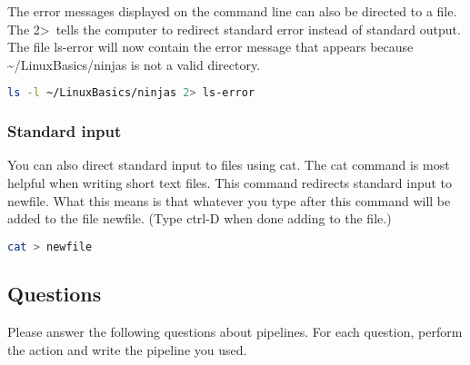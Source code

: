 \documentclass[11pt,a4paper]{article}
\begin{document}
\indent The error messages displayed on the command line can also be directed to a file. The 2\textgreater\ tells the computer to redirect standard error instead of standard output. The file ls-error will now contain the error message that appears because \textasciitilde /LinuxBasics/ninjas is not a valid directory.

\begin{lstlisting}[basicstyle=\ttfamily, backgroundcolor = \color{lightgray}, language = bash, xleftmargin = 0cm, framexleftmargin = 1em]
ls -l ~/LinuxBasics/ninjas 2> ls-error
\end{lstlisting}

\subsubsection*{Standard input}

You can also direct standard input to files using cat. The cat command is most helpful when writing short text files. This command redirects standard input to newfile. What this means is that whatever you type after this command will be added to the file newfile. (Type ctrl-D when done adding to the file.)

\begin{lstlisting}[basicstyle=\ttfamily, backgroundcolor = \color{lightgray}, language = bash, xleftmargin = 0cm, framexleftmargin = 1em]
cat > newfile
\end{lstlisting}


\subsection*{Questions}

\indent\indent Please answer the following questions about pipelines. For each question, perform the action and write the pipeline you used.
\end{document}
